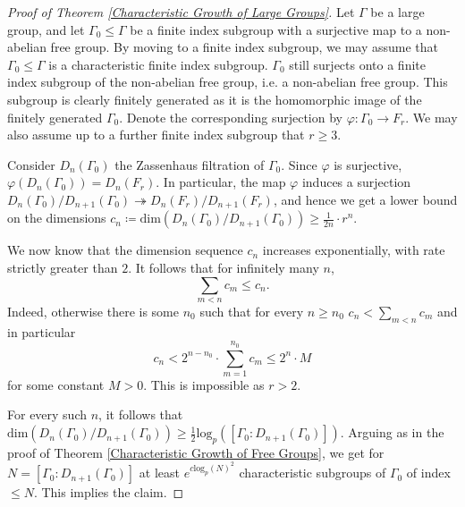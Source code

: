 \documentclass[letterpaper]{amsart}
\begin{document}
\begin{proof}[Proof of Theorem \ref{Characteristic Growth of Large Groups}]
Let $\Gamma$ be a large group, and let $\Gamma_0 \leq \Gamma$ be a finite index subgroup with a surjective map to a non-abelian free group. By moving to a finite index subgroup, we may assume that $\Gamma_0 \leq \Gamma$ is a characteristic finite index subgroup. $\Gamma_0$ still surjects onto a finite index subgroup of the non-abelian free group, i.e. a non-abelian free group. This subgroup is clearly finitely generated as it is the homomorphic image of the finitely generated $\Gamma_0$. Denote the corresponding surjection by $\varphi: \Gamma_0 \to F_r$. We may also assume up to a further finite index subgroup that $r \geq 3$.

Consider $D_n(\Gamma_0)$ the Zassenhaus filtration of $\Gamma_0$. Since $\varphi$ is surjective, $\varphi(D_n(\Gamma_0)) = D_n(F_r)$. In particular, the map $\varphi$ induces a surjection $D_n(\Gamma_0) / D_{n + 1}(\Gamma_0) \twoheadrightarrow D_n(F_r) / D_{n + 1}(F_r)$, and hence we get a lower bound on the dimensions $c_n \coloneq \mathrm{dim}(D_n(\Gamma_0) / D_{n + 1}(\Gamma_0)) \geq \frac{1}{2n} \cdot r^n$.

We now know that the dimension sequence $c_n$ increases exponentially, with rate strictly greater than $2$. It follows that for infinitely many $n$, $$\sum_{m<n} c_m \leq c_n.$$
Indeed, otherwise there is some $n_0$ such that for every $n \geq n_0$ $c_n < \sum_{m < n} c_m$ and in particular $$c_n < 2^{n - n_0} \cdot \sum_{m = 1}^{n_0} c_m \leq 2^n \cdot M$$ for some constant $M > 0$. This is impossible as $r > 2$.

For every such $n$, it follows that $\mathrm{dim}(D_n(\Gamma_0) / D_{n+1}(\Gamma_0)) \geq \frac{1}{2} \mathrm{log}_p([\Gamma_0 : D_{n + 1}(\Gamma_0)])$. Arguing as in the proof of Theorem \ref{Characteristic Growth of Free Groups}, we get for $N = [\Gamma_0: D_{n + 1}(\Gamma_0)]$ at least $e^{c \mathrm{log}_p(N)^2}$ characteristic subgroups of $\Gamma_0$ of index $\leq N$. This implies the claim.
\end{proof}
\end{document}
